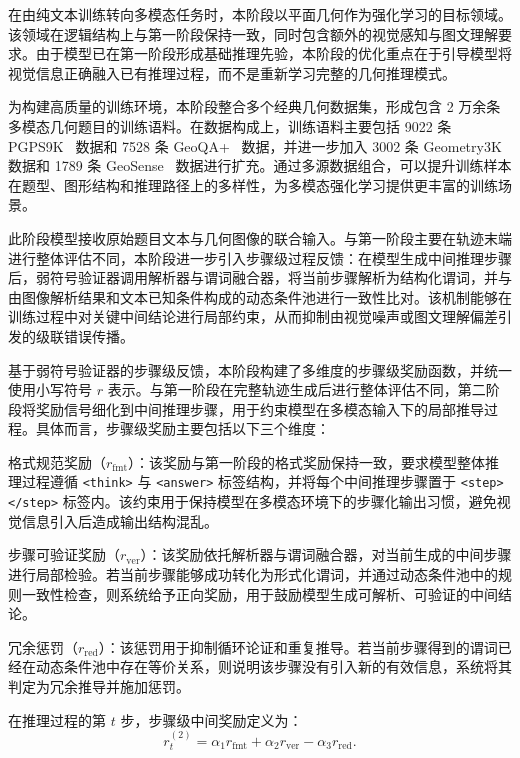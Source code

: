 
在由纯文本训练转向多模态任务时，本阶段以平面几何作为强化学习的目标领域。该领域在逻辑结构上与第一阶段保持一致，同时包含额外的视觉感知与图文理解要求。由于模型已在第一阶段形成基础推理先验，本阶段的优化重点在于引导模型将视觉信息正确融入已有推理过程，而不是重新学习完整的几何推理模式。

为构建高质量的训练环境，本阶段整合多个经典几何数据集，形成包含 2 万余条多模态几何题目的训练语料。在数据构成上，训练语料主要包括 9022 条 PGPS9K~\cite{zhang2023pgps} 数据和 7528 条 GeoQA+~\cite{cao2022geoqa_plus} 数据，并进一步加入 3002 条 Geometry3K~\cite{lu2021intergps} 数据和 1789 条 GeoSense~\cite{xu2025geosense} 数据进行扩充。通过多源数据组合，可以提升训练样本在题型、图形结构和推理路径上的多样性，为多模态强化学习提供更丰富的训练场景。

此阶段模型接收原始题目文本与几何图像的联合输入。与第一阶段主要在轨迹末端进行整体评估不同，本阶段进一步引入步骤级过程反馈：在模型生成中间推理步骤后，弱符号验证器调用解析器与谓词融合器，将当前步骤解析为结构化谓词，并与由图像解析结果和文本已知条件构成的动态条件池进行一致性比对。该机制能够在训练过程中对关键中间结论进行局部约束，从而抑制由视觉噪声或图文理解偏差引发的级联错误传播。


基于弱符号验证器的步骤级反馈，本阶段构建了多维度的步骤级奖励函数，并统一使用小写符号 $r$ 表示。与第一阶段在完整轨迹生成后进行整体评估不同，第二阶段将奖励信号细化到中间推理步骤，用于约束模型在多模态输入下的局部推导过程。具体而言，步骤级奖励主要包括以下三个维度：

格式规范奖励（$r_{\mathrm{fmt}}$）：该奖励与第一阶段的格式奖励保持一致，要求模型整体推理过程遵循 \texttt{<think>} 与 \texttt{<answer>} 标签结构，并将每个中间推理步骤置于 \texttt{<step></step>} 标签内。该约束用于保持模型在多模态环境下的步骤化输出习惯，避免视觉信息引入后造成输出结构混乱。

步骤可验证奖励（$r_{\mathrm{ver}}$）：该奖励依托解析器与谓词融合器，对当前生成的中间步骤进行局部检验。若当前步骤能够成功转化为形式化谓词，并通过动态条件池中的规则一致性检查，则系统给予正向奖励，用于鼓励模型生成可解析、可验证的中间结论。

冗余惩罚（$r_{\mathrm{red}}$）：该惩罚用于抑制循环论证和重复推导。若当前步骤得到的谓词已经在动态条件池中存在等价关系，则说明该步骤没有引入新的有效信息，系统将其判定为冗余推导并施加惩罚。

在推理过程的第 $t$ 步，步骤级中间奖励定义为：
\begin{equation}
  r_t^{(2)} = \alpha_1 r_{\mathrm{fmt}} + \alpha_2 r_{\mathrm{ver}} - \alpha_3 r_{\mathrm{red}}.
\end{equation}

